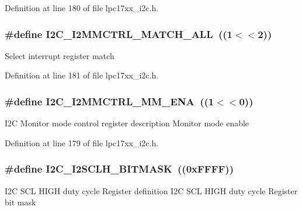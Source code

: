 \-Definition at line 180 of file lpc17xx\-\_\-i2c.\-h.

\hypertarget{group___i2_c___private___macros_gac7dd5efba503dd79c6b42f3575f70307}{
\subsubsection[{\-I2\-C\-\_\-\-I2\-M\-M\-C\-T\-R\-L\-\_\-\-M\-A\-T\-C\-H\-\_\-\-A\-L\-L}]{\setlength{\rightskip}{0pt plus 5cm}\#define {\bf \-I2\-C\-\_\-\-I2\-M\-M\-C\-T\-R\-L\-\_\-\-M\-A\-T\-C\-H\-\_\-\-A\-L\-L}~((1$<$$<$2))}}\label{group___i2_c___private___macros_gac7dd5efba503dd79c6b42f3575f70307}
\-Select interrupt register match 

\-Definition at line 181 of file lpc17xx\-\_\-i2c.\-h.

\hypertarget{group___i2_c___private___macros_ga8dc8fa566a5113c3e1b35c0580d90d9f}{
\subsubsection[{\-I2\-C\-\_\-\-I2\-M\-M\-C\-T\-R\-L\-\_\-\-M\-M\-\_\-\-E\-N\-A}]{\setlength{\rightskip}{0pt plus 5cm}\#define {\bf \-I2\-C\-\_\-\-I2\-M\-M\-C\-T\-R\-L\-\_\-\-M\-M\-\_\-\-E\-N\-A}~((1$<$$<$0))}}\label{group___i2_c___private___macros_ga8dc8fa566a5113c3e1b35c0580d90d9f}
\-I2\-C \-Monitor mode control register description \-Monitor mode enable 

\-Definition at line 179 of file lpc17xx\-\_\-i2c.\-h.

\hypertarget{group___i2_c___private___macros_gad6a9a202cf4d30607475338f7b59968a}{
\subsubsection[{\-I2\-C\-\_\-\-I2\-S\-C\-L\-H\-\_\-\-B\-I\-T\-M\-A\-S\-K}]{\setlength{\rightskip}{0pt plus 5cm}\#define {\bf \-I2\-C\-\_\-\-I2\-S\-C\-L\-H\-\_\-\-B\-I\-T\-M\-A\-S\-K}~((0x\-F\-F\-F\-F))}}\label{group___i2_c___private___macros_gad6a9a202cf4d30607475338f7b59968a}
\-I2\-C \-S\-C\-L \-H\-I\-G\-H duty cycle \-Register definition \-I2\-C \-S\-C\-L \-H\-I\-G\-H duty cycle \-Register bit mask 

